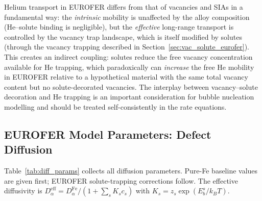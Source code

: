 \documentclass[pdflatex,sn-basic]{sn-jnl} %
\begin{document}
Helium transport in EUROFER differs from that of vacancies and SIAs in a
fundamental way: the \emph{intrinsic} mobility is unaffected by the alloy
composition (He--solute binding is negligible), but the \emph{effective}
long-range transport is controlled by the vacancy trap landscape, which is
itself modified by solutes (through the vacancy trapping described in
Section~\ref{sec:vac_solute_eurofer}). This creates an indirect coupling:
solutes reduce the free vacancy concentration available for He trapping,
which paradoxically can \emph{increase} the free He mobility in EUROFER
relative to a hypothetical material with the same total vacancy content but
no solute-decorated vacancies. The interplay between vacancy--solute
decoration and He trapping is an important consideration for bubble
nucleation modelling and should be treated self-consistently in the rate
equations.
\subsection{EUROFER Model Parameters: Defect Diffusion}
\label{sec:params_diffusion}

Table~\ref{tab:diff_params} collects all diffusion parameters. Pure-Fe
baseline values are given first; EUROFER solute-trapping corrections follow.
The effective diffusivity is $D_\alpha^{\mathrm{eff}} = D_\alpha^{\mathrm{Fe}}/(1+\sum_s K_s c_s)$
with $K_s = z_s\exp(E_b^s/k_BT)$.
\end{document}
